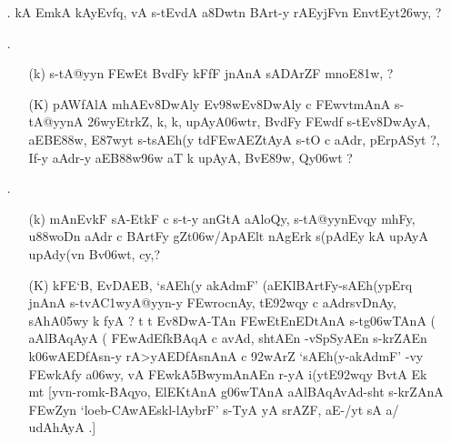 \def\DevnagVersion{2.15}\documentclass{article}
\begin{document}
\begin{itemize}
  \item[{\dn\dnnum \rn{1}}.] {\dn kA EmkA kAy\0Evf\?q, vA s\2-tEvdA a\38Dwtn\? BArt-y rAEyjFvn\? Env\0t\0Eyt\326wy, {\rs ?\re}}  
  
  \item[{\dn\dnnum \rn{2}}.] \begin{itemize} 
                        \item[({\dn k})] {\dn s\2-tA@yyn\2 \3FEwEt BvdFy\? kFfF jnAnA\2 sADArZF mnoE\381w, {\rs ?\re}}
                        
                        \item[({\dn K})] {\dn pAWfAlA mhAEv\38DwAly\? Ev\398wEv\38DwAly\? c \3FEwvt\0mAnA s\2-tA@yynA \326wyEtr\?k\?Z{\rs ,\re} k\4, k\4, upAyA\306wtr\4, BvdFy\? \3FEwd\?f\? s\2-tEv\38DwAyA, aEBE\388w, E\387wyt\?{\rs ,\re} s\2-tsAEh(y\? td\3FEwAEZtAyA\2 s\2-tO c aAdr, pErpASyt\? {\rs ?,\re} If-y aAdr-y aEB\388w\?\396w aT\?{\qvb} k\? upAyA, BvE\389w, Qy\306wt\? {\rs ?\re}}
                       \end{itemize}
                       
 \item[{\dn\dnnum \rn{3}}.] \begin{itemize}
                      \item[({\dn k})] {\dn mAnEvkF sA\2-EtkF c s\2-t-y anG\0tA aAloQy{\rs ,\re} s\2-tA@yynEvqy\? mhFy, u\388woDn aAdr\2 c BArtFy gZt\306w/ApAElt\? nAgErk\? s(pAdEy\2 kA upAyA upAd\?y(v\?n Bv\306wt, cy\?,{\rs ?\re}}
                      
                      \item[({\dn K})] {\dn kFE`B, EvDAEB, {\rs `\re}sAEh(y akAd\?mF{\rs '\re} {\rs (\re}aEKlBArtFy{\rs -\re}sAEh(ypErq jnAnA\2 s\2-tvA\3C1wyA@yyn-y \3FEwrocnAy{\rs ,\re} tE\392wqy\? c aAdrs\2vD\0nAy{\rs ,\re} sAhA\305wy\2 k\0 fyA {\rs ?\re} t\? t\? Ev\38DwA-TAn\?  \3FEwEtEnEDtAnA\2 s\2-tg\5\306wTAnA {\rs (\re}\dn\dnnum {} aAlBAqAyA\2 {\rs (\re}\dn\dnnum {} \3FEwAd\?EfkBAqA c avAd\4, shtAEn -vSpSyAEn  s\2-krZAEn k\?\306wAEDfAsn-y rA>yAEDfAsnAnA\2 c \392wAr\?Z  {\rs `\re}sAEh(y{\rs -\re}akAd\?mF{\rs '\re} -vy\2 \3FEwkAfy\? a\306wy\4, vA \3FEwkA\35BwymAnAEn r-yA\0 i(y\?tE\392wqy\? BvtA\2 Ek\2 mt {\rs [\re}yvn{\rs -\re}romk{\rs -\re}BAqyo, ElEKtAnA\2 g\5\306wTAnA aAlBAqAvAd{\rs -\re}sht s\2-krZAnA\2 \3FEwZyn\?{\rs ,\re} {\rs `\re}loeb{\rs -\re}\3CAwAEskl{\rs -\re}lAyb\5rF{\rs '\re} s\2-TyA yA srAZF, aE-/yt\?{\rs ,\re} sA a/ udAhAyA\0 .{\rs ]\re}}
                      

\end{itemize}
\end{itemize}
\end{document}
